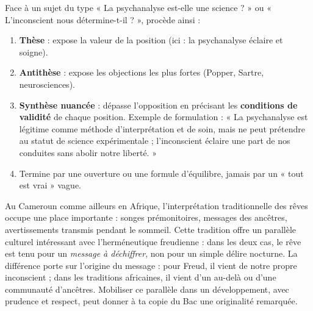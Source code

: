 \documentclass[11pt]{article}
\begin{document}
\begin{methode}
Face à un sujet du type « La psychanalyse est-elle une science ? » ou « L'inconscient nous détermine-t-il ? », procède ainsi :
\begin{enumerate}
\item \textbf{Thèse} : expose la valeur de la position (ici : la psychanalyse éclaire et soigne).
\item \textbf{Antithèse} : expose les objections les plus fortes (Popper, Sartre, neurosciences).
\item \textbf{Synthèse nuancée} : dépasse l'opposition en précisant les \textbf{conditions de validité} de chaque position. Exemple de formulation : « La psychanalyse est légitime comme méthode d'interprétation et de soin, mais ne peut prétendre au statut de science expérimentale ; l'inconscient éclaire une part de nos conduites sans abolir notre liberté. »
\item Termine par une ouverture ou une formule d'équilibre, jamais par un « tout est vrai » vague.
\end{enumerate}
\end{methode}

\begin{savaistu}
Au Cameroun comme ailleurs en Afrique, l'interprétation traditionnelle des rêves occupe une place importante : songes prémonitoires, messages des ancêtres, avertissements transmis pendant le sommeil. Cette tradition offre un parallèle culturel intéressant avec l'herméneutique freudienne : dans les deux cas, le rêve est tenu pour un \emph{message à déchiffrer}, non pour un simple délire nocturne. La différence porte sur l'origine du message : pour Freud, il vient de notre propre inconscient ; dans les traditions africaines, il vient d'un au-delà ou d'une communauté d'ancêtres. Mobiliser ce parallèle dans un développement, avec prudence et respect, peut donner à ta copie du Bac une originalité remarquée.
\end{savaistu}
\end{document}

